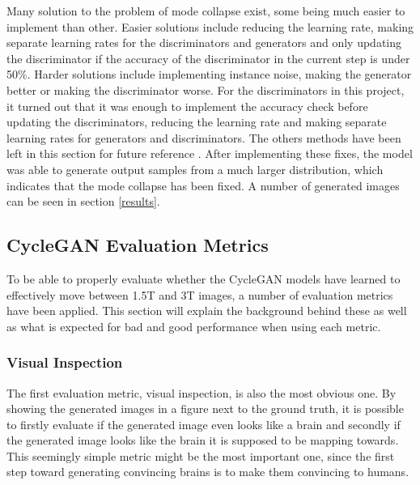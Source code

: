 \documentclass[12pt, fleqn, titlepage]{article}
\newcommand{\1}[1]{\mathds{1}\left[#1\right]}
\begin{document}
Many solution to the problem of mode collapse exist, some being much easier to implement than other. Easier solutions include reducing the learning rate, making separate learning rates for the discriminators and generators and only updating the discriminator if the accuracy of the discriminator in the current step is under 50\%. Harder solutions include implementing instance noise, making the generator better or making the discriminator worse. For the discriminators in this project, it turned out that it was enough to implement the accuracy check before updating the discriminators, reducing the learning rate and making separate learning rates for generators and discriminators. The others methods have been left in this section for future reference \cite{mode_collapse_reddit_fix}\cite{mode_collapse_github}. After implementing these fixes, the model was able to generate output samples from a much larger distribution, which indicates that the mode collapse has been fixed. A number of generated images can be seen in section \ref{results}.


\subsection{CycleGAN Evaluation Metrics}\label{evaluation_metrics}
To be able to properly evaluate whether the CycleGAN models have learned to effectively move between 1.5T and 3T images, a number of evaluation metrics have been applied. This section will explain the background behind these as well as what is expected for bad and good performance when using each metric.

\subsubsection{Visual Inspection}\label{visual_inspection}
The first evaluation metric, visual inspection, is also the most obvious one. By showing the generated images in a figure next to the ground truth, it is possible to firstly evaluate if the generated image even looks like a brain and secondly if the generated image looks like the brain it is supposed to be mapping towards. This seemingly simple metric might be the most important one, since the first step toward generating convincing brains is to make them convincing to humans.
\end{document}

